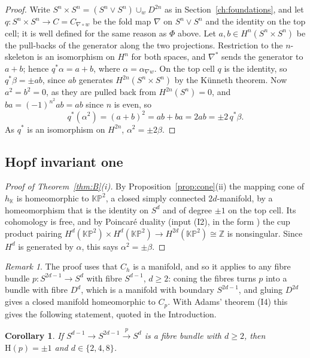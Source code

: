 \documentclass[11pt]{amsart}
\numberwithin{equation}{section}
\theoremstyle{plain}
\newtheorem{corollary}[theorem]{Corollary}
\theoremstyle{definition}
\theoremstyle{remark}
\newtheorem{remark}[theorem]{Remark}
\newcommand{\K}{\mathbb{K}}
\newcommand{\Z}{\mathbb{Z}}
\newcommand{\KP}{\mathbb{KP}}
\newcommand{\Hopf}{\mathrm{H}}
\begin{document}
\begin{proof}
Write $S^n\times S^n=(S^n\vee S^n)\cup_wD^{2n}$ as in Section~\ref{ch:foundations}, and let $q\colon S^n\times S^n\to C=C_{\nabla\circ w}$ be the fold map $\nabla$ on $S^n\vee S^n$ and the identity on the top cell; it is well defined for the same reason as $\Phi$ above. Let $a,b\in H^n(S^n\times S^n)$ be the pull-backs of the generator along the two projections. Restriction to the $n$-skeleton is an isomorphism on $H^n$ for both spaces, and $\nabla^*$ sends the generator to $a+b$; hence $q^*\alpha=a+b$, where $\alpha=\alpha_{\nabla w}$. On the top cell $q$ is the identity, so $q^*\beta=\pm ab$, since $ab$ generates $H^{2n}(S^n\times S^n)$ by the K\"unneth theorem. Now $a^2=b^2=0$, as they are pulled back from $H^{2n}(S^n)=0$, and $ba=(-1)^{n^2}ab=ab$ since $n$ is even, so
\[
q^*(\alpha^2)=(a+b)^2=ab+ba=2ab=\pm2\,q^*\beta .
\]
As $q^*$ is an isomorphism on $H^{2n}$, $\alpha^2=\pm2\beta$.
\end{proof}

\subsection{Hopf invariant one}\label{sec:hone}

\begin{proof}[Proof of Theorem~\ref{thm:B}\textup{(i)}]
By Proposition~\ref{prop:cone}(ii) the mapping cone of $h_\K$ is homeomorphic to $\KP^2$, a closed simply connected $2d$-manifold, by a homeomorphism that is the identity on $S^d$ and of degree $\pm1$ on the top cell. Its cohomology is free, and by Poincar\'e duality (input (I2), in the form \cite[Proposition~3.38]{Hat02}) the cup product pairing $H^d(\KP^2)\times H^d(\KP^2)\to H^{2d}(\KP^2)\cong\Z$ is nonsingular. Since $H^d$ is generated by $\alpha$, this says $\alpha^2=\pm\beta$.
\end{proof}

\begin{remark}
The proof uses that $C_{h}$ is a manifold, and so it applies to any fibre bundle $p\colon S^{2d-1}\to S^d$ with fibre $S^{d-1}$, $d\ge2$: coning the fibres turns $p$ into a bundle with fibre $D^d$, which is a manifold with boundary $S^{2d-1}$, and gluing $D^{2d}$ gives a closed manifold homeomorphic to $C_p$. With Adams' theorem (I4) this gives the following statement, quoted in the Introduction.
\end{remark}

\begin{corollary}\label{cor:spherebundles}
If $S^{d-1}\to S^{2d-1}\xrightarrow{\,p\,}S^d$ is a fibre bundle with $d\ge2$, then $\Hopf(p)=\pm1$ and $d\in\{2,4,8\}$.
\end{corollary}
\end{document}

